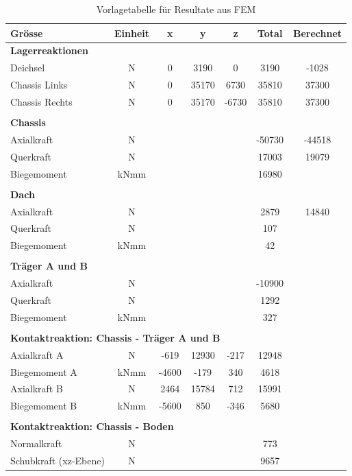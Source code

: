 \begin{table}[h!]
\centering
\begin{tabular}{lcccccc}
Grösse	&	Einheit	&	x	&	y	&	z	&	Total	&	Berechnet	\\	\hline
\multicolumn{5}{l}{\textbf{Lagerreaktionen}}									&		&		\\	\thickhline
Deichsel	&	N	&	0	&	3190	&	0	&	3190	&	-1028	\\
Chassis Links	&	N	&	0	&	35170	&	6730	&	35810	&	37300	\\
Chassis Rechts	&	N	&	0	&	35170	&	-6730	&	35810	&	37300	\\	\hline	\\
\multicolumn{5}{l}{\textbf{Chassis}}									&		&		\\	\thickhline
Axialkraft	&	N	&		&		&		&	-50730	&	-44518	\\
Querkraft	&	N	&		&		&		&	17003	&	19079\footnotemark	\\
Biegemoment	&	kNmm	&		&		&		&	16980	&		\\	\hline	\\
\multicolumn{5}{l}{\textbf{Dach}}									&		&		\\	\thickhline
Axialkraft	&	N	&		&		&		&	2879	&	14840	\\
Querkraft	&	N	&		&		&		&	107	&		\\
Biegemoment	&	kNmm	&		&		&		&	42	&		\\	\hline	\\
\multicolumn{5}{l}{\textbf{Träger A und B}}													\\	\thickhline
Axialkraft	&	N	&		&		&		&	-10900	&		\\
Querkraft	&	N	&		&		&		&	1292	&		\\
Biegemoment	&	kNmm	&		&		&		&	327	&		\\	\hline	\\
\multicolumn{5}{l}{\textbf{Kontaktreaktion: Chassis - Träger A und B}}									&		&		\\	\thickhline
 Axialkraft A	&	N	&	-619	&	12930	&	-217	&	12948	&		\\
Biegemoment A	&	kNmm	&	-4600	&	-179	&	340	&	4618	&		\\
Axialkraft B	&	N	&	2464	&	15784	&	712	&	15991	&		\\
Biegemoment B	&	kNmm	&	-5600	&	850	&	-346	&	5680	&		\\	\hline	\\
\multicolumn{5}{l}{\textbf{Kontaktreaktion: Chassis - Boden}}									&		&		\\	\thickhline
Normalkraft	&	N	&		&		&		&	773	&		\\
Schubkraft (xz-Ebene)	&	N	&		&		&		&	9657	&		\\	\hline
\end{tabular}
\caption{Vorlagetabelle für Resultate aus FEM}%
\label{Resultate Vorlage}
\end{table}


